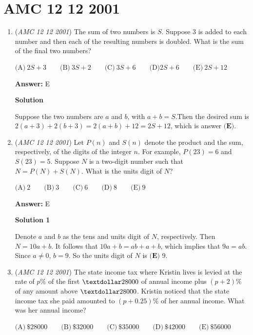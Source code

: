 \section{AMC 12 12 2001}
        \begin{enumerate}
        	\item (\textit{AMC 12 12 2001}) The sum of two numbers is $S$. Suppose $3$ is added to each number and then
each of the resulting numbers is doubled. What is the sum of the final two
numbers?


 $\text{(A)}\ 2S + 3\qquad \text{(B)}\ 3S + 2\qquad \text{(C)}\ 3S + 6 \qquad\text{(D)} 2S + 6 \qquad \text{(E)}\ 2S + 12$

 \textbf{Answer: }E



\textbf{Solution}

Suppose the two numbers are $a$ and $b$, with $a+b=S$.Then the desired sum is$2(a+3)+2(b+3)=2(a+b)+12=2S +12$, which is answer $\boxed{\textbf{(E)}}$.

 


	\item (\textit{AMC 12 12 2001}) Let $P(n)$ and $S(n)$ denote the product and the sum, respectively, of the digits
of the integer $n$. For example, $P(23) = 6$ and $S(23) = 5$. Suppose $N$ is a
two-digit number such that $N = P(N)+S(N)$. What is the units digit of $N$?


 $\text{(A)}\ 2\qquad \text{(B)}\ 3\qquad \text{(C)}\ 6\qquad \text{(D)}\ 8\qquad \text{(E)}\ 9$

 \textbf{Answer: }E



\textbf{Solution 1}

Denote $a$ and $b$ as the tens and units digit of $N$, respectively. Then $N = 10a+b$. It follows that $10a+b=ab+a+b$, which implies that $9a=ab$. Since $a\neq0$, $b=9$. So the units digit of $N$ is $\boxed{\textbf{(E) }9}$.

 


	\item (\textit{AMC 12 12 2001}) The state income tax where Kristin lives is levied at the rate of $p\%$ of the first
$\textdollar 28000$ of annual income plus $(p + 2)\%$ of any amount above $\textdollar 28000$. Kristin
noticed that the state income tax she paid amounted to $(p + 0.25)\%$ of her
annual income. What was her annual income?


 $\text{(A)}\ \$28000\qquad \text{(B)}\ \$32000\qquad \text{(C)}\ \$35000\qquad \text{(D)}\ \$42000\qquad \text{(E)}\ \$56000$


\end{enumerate}

